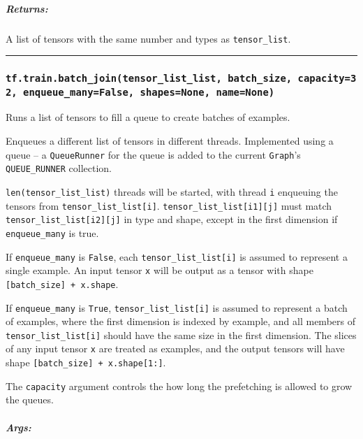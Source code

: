 \subparagraph{Returns: }\label{returns-54}

A list of tensors with the same number and types as
\texttt{tensor\_list}.

\begin{center}\rule{0.5\linewidth}{\linethickness}\end{center}

\subsubsection{\texorpdfstring{\texttt{tf.train.batch\_join(tensor\_list\_list,\ batch\_size,\ capacity=32,\ enqueue\_many=False,\ shapes=None,\ name=None)}
}{tf.train.batch\_join(tensor\_list\_list, batch\_size, capacity=32, enqueue\_many=False, shapes=None, name=None) }}\label{tf.train.batchux5fjointensorux5flistux5flist-batchux5fsize-capacity32-enqueueux5fmanyfalse-shapesnone-namenone}

Runs a list of tensors to fill a queue to create batches of examples.

Enqueues a different list of tensors in different threads. Implemented
using a queue -- a \texttt{QueueRunner} for the queue is added to the
current \texttt{Graph}'s \texttt{QUEUE\_RUNNER} collection.

\texttt{len(tensor\_list\_list)} threads will be started, with thread
\texttt{i} enqueuing the tensors from
\texttt{tensor\_list\_list{[}i{]}}.
\texttt{tensor\_list\_list{[}i1{]}{[}j{]}} must match
\texttt{tensor\_list\_list{[}i2{]}{[}j{]}} in type and shape, except in
the first dimension if \texttt{enqueue\_many} is true.

If \texttt{enqueue\_many} is \texttt{False}, each
\texttt{tensor\_list\_list{[}i{]}} is assumed to represent a single
example. An input tensor \texttt{x} will be output as a tensor with
shape \texttt{{[}batch\_size{]}\ +\ x.shape}.

If \texttt{enqueue\_many} is \texttt{True},
\texttt{tensor\_list\_list{[}i{]}} is assumed to represent a batch of
examples, where the first dimension is indexed by example, and all
members of \texttt{tensor\_list\_list{[}i{]}} should have the same size
in the first dimension. The slices of any input tensor \texttt{x} are
treated as examples, and the output tensors will have shape
\texttt{{[}batch\_size{]}\ +\ x.shape{[}1:{]}}.

The \texttt{capacity} argument controls the how long the prefetching is
allowed to grow the queues.

\subparagraph{Args: }\label{args-64}


